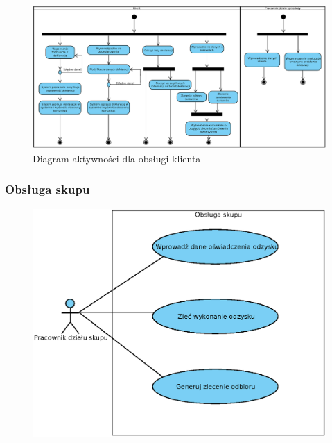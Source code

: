 	\begin{figure}[H]
		\centering
		\includegraphics[width=.9\textwidth]{img/AD/klient.eps}
		\caption{Diagram aktywności dla obsługi klienta}
	\end{figure}

\subsubsection{Obsługa skupu}

	\begin{figure}[H]
		\centering
		\includegraphics[width=.8\textwidth]{img/UC/skup.eps}
	\end{figure}

